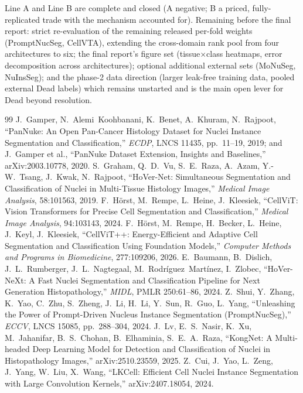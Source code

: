 \documentclass[11pt]{article}
\begin{document}
Line A and Line B are complete and closed (A negative; B a priced, fully-replicated trade
with the mechanism accounted for). Remaining before the final report: strict re-evaluation of
the remaining released per-fold weights (PromptNucSeg, CellVTA), extending the cross-domain
rank pool from four architectures to six; the final report's figure set (tissue$\times$class
heatmaps, error decomposition across architectures); optional additional external sets
(MoNuSeg, NuInsSeg); and the phase-2 data direction (larger leak-free training data, pooled
external Dead labels) which remains unstarted and is the main open lever for Dead beyond
resolution.

\begin{thebibliography}{99}\small
{} J.~Gamper, N.~Alemi~Koohbanani, K.~Benet, A.~Khuram, N.~Rajpoot,
``PanNuke: An Open Pan-Cancer Histology Dataset for Nuclei Instance Segmentation and
Classification,'' \emph{ECDP}, LNCS 11435, pp.~11--19, 2019; and J.~Gamper et al., ``PanNuke
Dataset Extension, Insights and Baselines,'' arXiv:2003.10778, 2020.
 S.~Graham, Q.~D.~Vu, S.~E.~Raza, A.~Azam, Y.-W.~Tsang,
J.~Kwak, N.~Rajpoot, ``HoVer-Net: Simultaneous Segmentation and Classification of Nuclei in
Multi-Tissue Histology Images,'' \emph{Medical Image Analysis}, 58:101563, 2019.
 F.~H\"orst, M.~Rempe, L.~Heine, J.~Kleesiek, ``CellViT: Vision
Transformers for Precise Cell Segmentation and Classification,'' \emph{Medical Image
Analysis}, 94:103143, 2024.
 F.~H\"orst, M.~Rempe, H.~Becker, L.~Heine, J.~Keyl, J.~Kleesiek,
``CellViT++: Energy-Efficient and Adaptive Cell Segmentation and Classification Using
Foundation Models,'' \emph{Computer Methods and Programs in Biomedicine}, 277:109206, 2026.
 E.~Baumann, B.~Dislich, J.~L.~Rumberger, J.~L.~Nagtegaal,
M.~Rodr\'iguez~Mart\'inez, I.~Zlobec, ``HoVer-NeXt: A Fast Nuclei Segmentation and
Classification Pipeline for Next Generation Histopathology,'' \emph{MIDL}, PMLR 250:61--86,
2024.
 Z.~Shui, Y.~Zhang, K.~Yao, C.~Zhu, S.~Zheng, J.~Li, H.~Li, Y.~Sun,
R.~Guo, L.~Yang, ``Unleashing the Power of Prompt-Driven Nucleus Instance Segmentation
(PromptNucSeg),'' \emph{ECCV}, LNCS 15085, pp.~288--304, 2024.
 J.~Lv, E.~S.~Nasir, K.~Xu, M.~Jahanifar, B.~S.~Chohan,
B.~Elhaminia, S.~E.~A.~Raza, ``KongNet: A Multi-headed Deep Learning Model for Detection and
Classification of Nuclei in Histopathology Images,'' arXiv:2510.23559, 2025.
 Z.~Cui, J.~Yao, L.~Zeng, J.~Yang, W.~Liu, X.~Wang, ``LKCell:
Efficient Cell Nuclei Instance Segmentation with Large Convolution Kernels,''
arXiv:2407.18054, 2024.
\end{thebibliography}
\end{document}
